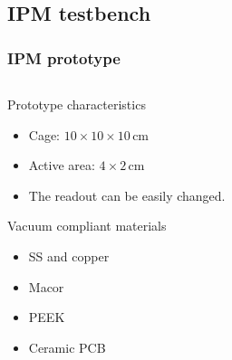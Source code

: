 \subsection{IPM testbench}
\begin{frame}
  \frametitle{IPM prototype}
  \begin{columns}
    \begin{column}{0.45\textwidth}
      \begin{block}{Prototype characteristics}
        \begin{itemize}
          \item Cage: $10\times10\times10\,\mathrm{cm}$
          \item Active area: $4\times2\,\mathrm{cm}$
          \item The readout can be easily changed.
        \end{itemize}
      \end{block}

      \begin{block}{Vacuum compliant materials}
        \begin{itemize}
          \item SS and copper
          \item Macor
          \item PEEK
          \item Ceramic PCB
        \end{itemize}
      \end{block}


\end{column}
\end{columns}
\end{frame}
